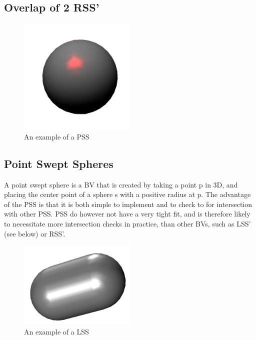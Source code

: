 \subsection{Overlap of 2 RSS'}


\begin{figure}
\centering
\includegraphics[width=0.5\textwidth]{figures/pss}
\caption{\label{pss-example}An example of a PSS}
\end{figure}

\subsection{Point Swept Spheres}
A point swept sphere is a BV that is created by taking a point p in 3D, and placing the center point of a sphere s with a positive radius at p. The advantage of the PSS is that it is both simple to implement and to check to for intersection with other PSS. PSS do however not have a very tight fit, and is therefore likely to necessitate more intersection checks in practice, than other BVs, such as LSS' (see below) or RSS'.

\begin{figure}
\centering
\includegraphics[width=0.5\textwidth]{figures/lss}
\caption{\label{lss-example}An example of a LSS}
\end{figure}

